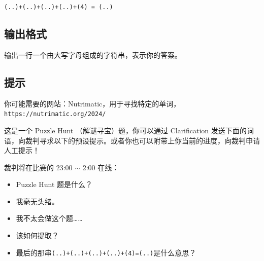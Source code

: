\texttt{(..)+(..)+(..)+(..)+(4) = (..)}

\subsection{输出格式}

输出一行一个由大写字母组成的字符串，表示你的答案。

\subsection{提示}

你可能需要的网站：Nutrimatic，用于寻找特定的单词，\texttt{https://nutrimatic.org/2024/}

这是一个 Puzzle Hunt （解谜寻宝）题，你可以通过 Clarification 发送下面的词语，向裁判寻求以下的预设提示。或者你也可以附带上你当前的进度，向裁判申请人工提示！

裁判将在比赛的 23:00 $\sim$ 2:00 在线：

\begin{itemize}
   \item Puzzle Hunt 题是什么？
   \item 我毫无头绪。
   \item 我不太会做这个题……
   \item 该如何提取？
   \item 最后的那串\texttt{(..)+(..)+(..)+(..)+(4)=(..)}是什么意思？
\end{itemize}
